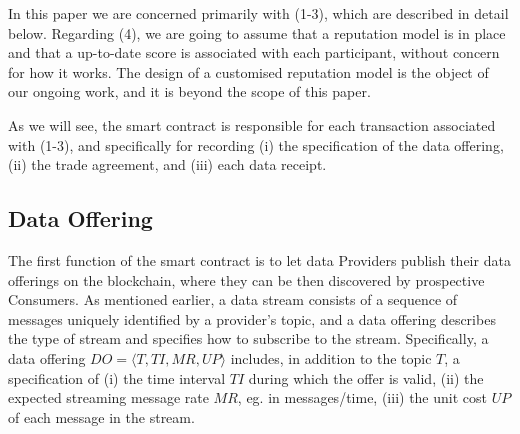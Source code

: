 \documentclass[letterpaper, 10 pt, conference]{ieeeconf}  %
\newcommand{\topic}{\ensuremath{\mathit{T}}}
\newcommand{\ti}{\ensuremath{\mathit{TI}}}
\newcommand{\mr}{\ensuremath{\mathit{MR}}}
\newcommand{\up}{\ensuremath{\mathit{UP}}}
\newcommand{\doff}{\ensuremath{\mathit{DO}}}
\begin{document}
In this paper we are concerned primarily with (1-3), which are described in detail below. Regarding (4), we are going to assume that a reputation model is in place and that a up-to-date score is associated with each participant, without concern for how it works. The design of a customised reputation model is the object of our ongoing work, and it is beyond the scope of this paper.

As we will see, the smart contract is responsible for each transaction associated with (1-3), and specifically for recording (i) the specification of the data offering, (ii) the trade agreement, and (iii) each data receipt.

\subsection{Data Offering}

The first function of the smart contract is to let data Providers publish their data offerings on the blockchain, where they can be then discovered by prospective Consumers. 
As mentioned earlier, a data stream consists of a sequence of messages uniquely identified by  a provider's topic, and a data offering describes the type of stream and specifies how to subscribe to the stream.
Specifically, a data offering $\doff = \langle \topic, \ti, \mr, \up \rangle$ includes, in addition to the topic \topic, a specification of (i) the time interval \ti{} during which the offer is valid, (ii) the expected streaming message rate \mr, eg. in messages/time, (iii) the unit cost \up{} of each message in the stream.

%
%
%
%

%
\end{document}
